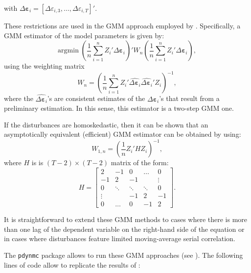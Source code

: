 \documentclass[
  12pt,
]{book}
\theoremstyle{definition}
\theoremstyle{definition}
\theoremstyle{definition}
\theoremstyle{definition}
\theoremstyle{remark}
\begin{document}
with \(\Delta{\boldsymbol\varepsilon}_i = [ \Delta \varepsilon_{i,3},\dots,\Delta \varepsilon_{i,T}]'\).

These restrictions are used in the GMM approach employed by \citet{Arellano_Bond_1991}. Specifically, a GMM estimator of the model parameters is given by:
\[
\mbox{argmin}\;\left(\frac{1}{n} \sum_{i=1}^n Z_i' \Delta \boldsymbol\varepsilon_i\right)'W_n\left(\frac{1}{n} \sum_{i=1}^n Z_i' \Delta \boldsymbol\varepsilon_i\right),
\]
using the weighting matrix
\[
W_n = \left(\frac{1}{n}\sum_{i=1}^n Z_i'\widehat{\Delta\boldsymbol\varepsilon_i}\widehat{\Delta\boldsymbol\varepsilon_i}'Z_i\right)^{-1},
\]
where the \(\widehat{\Delta\boldsymbol\varepsilon_i}\)'s are consistent estimates of the \(\Delta\boldsymbol\varepsilon_i\)'s that result from a preliminary estimation. In this sense, this estimator is a two-step GMM one.

If the disturbances are homoskedastic, then it can be shown that an asymptotically equivalent (efficient) GMM estimator can be obtained by using:
\[
W_{1,n} = \left(\frac{1}{n}Z_i'HZ_i\right)^{-1},
\]
where \(H\) is is \((T-2) \times (T-2)\) matrix of the form:
\[
H = \left[\begin{array}{ccccccc}
2 & -1 & 0 & \dots &0 \\
-1 & 2 & -1 &  & \vdots \\
0 & \ddots& \ddots & \ddots & 0 \\
\vdots &  & -1 & 2&-1\\
0&\dots & 0 & -1 & 2
\end{array}\right].
\]

It is straightforward to extend these GMM methods to cases where there is more than one lag of the dependent variable on the right-hand side of the equation or in cases where disturbances feature limited moving-average serial correlation.

The \texttt{pdynmc} package allows to run these GMM approaches (see \citet{Fritsch_et_al_2019}). The following lines of code allow to replicate the results of \citet{Arellano_Bond_1991}:
\end{document}
